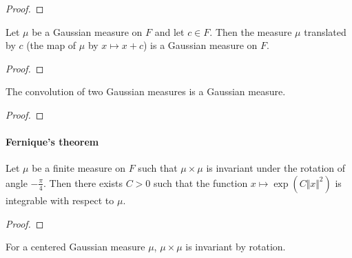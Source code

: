 \begin{proof}\leanok

\end{proof}


\begin{lemma}\label{lem:isGaussian_add_const}
  \leanok
Let $\mu$ be a Gaussian measure on $F$ and let $c \in F$.
Then the measure $\mu$ translated by $c$ (the map of $\mu$ by $x \mapsto x + c$) is a Gaussian measure on $F$.
\end{lemma}

\begin{proof}\leanok

\end{proof}


\begin{lemma}\label{lem:isGaussian_conv}
  \mathlibok
The convolution of two Gaussian measures is a Gaussian measure.
\end{lemma}

\begin{proof}\leanok

\end{proof}



\paragraph{Fernique's theorem}


\begin{theorem}\label{thm:exists_integrable_exp_sq_of_map_rotation_eq_self}
  \mathlibok
Let $\mu$ be a finite measure on $F$ such that $\mu \times \mu$ is invariant under the rotation of angle $-\frac{\pi}{4}$.
Then there exists $C > 0$ such that the function $x \mapsto \exp (C \Vert x \Vert ^ 2)$ is integrable with respect to $\mu$.
\end{theorem}

\begin{proof}\leanok

\end{proof}


\begin{lemma}\label{lem:IsGaussian.map_rotation_eq_self}
  \mathlibok
For a centered Gaussian measure $\mu$, $\mu \times \mu$ is invariant by rotation.
\end{lemma}


